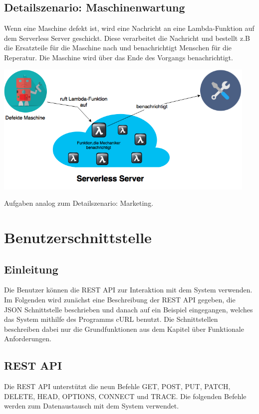 \documentclass[a4paper,20pt,oneside]{book}
\begin{document}
\pagebreak
\section{Detailszenario: Maschinenwartung}
Wenn eine Maschine defekt ist, wird eine Nachricht an eine \gls{Lambda-Funktion} auf dem \gls{Serverless} Server geschickt. Diese verarbeitet die Nachricht und bestellt z.B die Ersatzteile für die Maschine nach und benachrichtigt Menschen für die Reperatur.
Die Maschine wird  über das Ende des Vorgangs benachrichtigt.
\\
\begin{center}
\includegraphics[width=0.9\linewidth,height=240px]{maschine.png} 
\end{center}

Aufgaben analog zum Detailszenario: Marketing.

\chapter{Benutzerschnittstelle}

\section{Einleitung}
Die Benutzer können die REST \Gls{API} zur Interaktion mit dem System verwenden. Im Folgenden wird zunächst eine Beschreibung der REST \Gls{API} gegeben, die JSON Schnittstelle beschrieben und danach auf ein Beispiel eingegangen, welches das System mithilfe des Programms cURL benutzt.
Die Schnittstellen beschreiben dabei nur die Grundfunktionen aus dem Kapitel über Funktionale Anforderungen.

\section{REST \Gls{API}}
Die \Gls{REST} \Gls{API} unterstützt die neun Befehle GET, POST, PUT, PATCH, DELETE, HEAD, OPTIONS, CONNECT und TRACE. Die folgenden Befehle werden zum Datenaustausch mit dem System verwendet.
\end{document}
